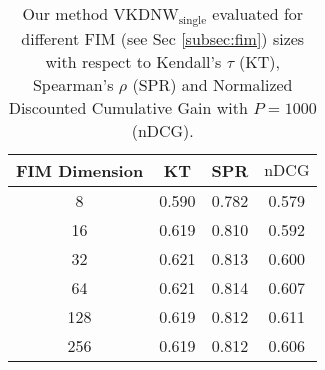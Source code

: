 \begin{table}
  \centering
  \small
  \begin{tabular}{c|ccc}
  \toprule
 FIM Dimension & KT & SPR & $\text{nDCG}$ \\
\hline
8 & 0.590 & 0.782 & 0.579 \\
16 & 0.619 & 0.810 & 0.592 \\
32 & 0.621 & 0.813 & 0.600 \\
64 & 0.621 & 0.814 & 0.607 \\
128 & 0.619 & 0.812 & 0.611 \\
256 & 0.619 & 0.812 & 0.606 \\
\bottomrule
  \end{tabular}
  \caption{Our method $\text{VKDNW}_{\text{single}}$ evaluated for different FIM (see Sec \ref{subsec:fim}) sizes with respect to Kendall's $\tau$ (KT), Spearman's $\rho$ (SPR) and Normalized Discounted Cumulative Gain with $P=1000$ (nDCG).}
    \label{tab:fim_dimension}
\end{table}

